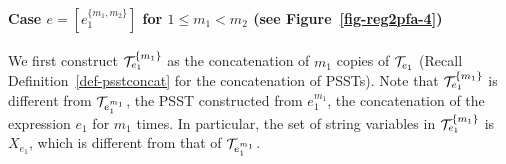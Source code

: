 \paragraph{Case $e = [e_1^{\{m_1,m_2\}}]$ for $1 \le m_1 < m_2$ (see Figure~\ref{fig-reg2pfa-4})} We first construct $\mathcal{T}^{\{m_1\}}_{e_1}$ as the concatenation of $m_1$ copies of $\mathcal{T}_{e_1}$ (Recall Definition~\ref{def-psstconcat} for the concatenation of PSSTs). Note that $\mathcal{T}^{\{m_1\}}_{e_1}$ is different from $\mathcal{T}_{e_1^{m_1}}$, the PSST constructed from $e_1^{m_1}$, the concatenation of the expression $e_1$ for $m_1$ times. In particular, the set of string variables in $\mathcal{T}^{\{m_1\}}_{e_1}$ is $X_{e_1}$, which is different from that of $\mathcal{T}_{e_1^{m_1}}$. 

